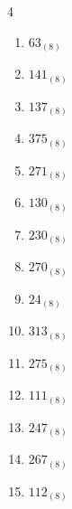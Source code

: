 \begin{multicols}{4}
\begin{enumerate}
        \phantom{$=134$}

  \item $63_{(8)}$

        \phantom{$=51$}

  \item $141_{(8)}$

        \phantom{$=97$}

  \item $137_{(8)}$

        \phantom{$=95$}

  \item $375_{(8)}$

        \phantom{$=253$}

  \item $271_{(8)}$

        \phantom{$=185$}

  \item $130_{(8)}$

        \phantom{$=88$}

  \item $230_{(8)}$

        \phantom{$=152$}

  \item $270_{(8)}$

        \phantom{$=184$}

  \item $24_{(8)}$

        \phantom{$=20$}

  \item $313_{(8)}$

        \phantom{$=203$}

  \item $275_{(8)}$

        \phantom{$=189$}

  \item $111_{(8)}$

        \phantom{$=73$}

  \item $247_{(8)}$

        \phantom{$=167$}

  \item $267_{(8)}$

        \phantom{$=183$}

\columnbreak %

\resetques

  \item $112_{(8)}$


\end{enumerate}
\end{multicols}
